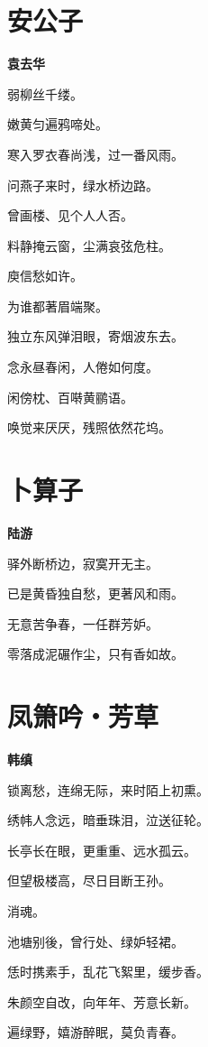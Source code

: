 \documentclass[12pt,a4paper]{ctexbook}
\begin{document}
\section{安公子}
\textbf{袁去华}\par\vspace{0.5em}
弱柳丝千缕。\par
嫩黄匀遍鸦啼处。\par
寒入罗衣春尚浅，过一番风雨。\par
问燕子来时，绿水桥边路。\par
曾画楼、见个人人否。\par
料静掩云窗，尘满哀弦危柱。\par
庾信愁如许。\par
为谁都著眉端聚。\par
独立东风弹泪眼，寄烟波东去。\par
念永昼春闲，人倦如何度。\par
闲傍枕、百啭黄鹂语。\par
唤觉来厌厌，残照依然花坞。\par

\section{卜算子}
\textbf{陆游}\par\vspace{0.5em}
驿外断桥边，寂寞开无主。\par
已是黄昏独自愁，更著风和雨。\par
无意苦争春，一任群芳妒。\par
零落成泥碾作尘，只有香如故。\par

\section{凤箫吟・芳草}
\textbf{韩缜}\par\vspace{0.5em}
锁离愁，连绵无际，来时陌上初熏。\par
绣帏人念远，暗垂珠泪，泣送征轮。\par
长亭长在眼，更重重、远水孤云。\par
但望极楼高，尽日目断王孙。\par
消魂。\par
池塘别後，曾行处、绿妒轻裙。\par
恁时携素手，乱花飞絮里，缓步香。\par
朱颜空自改，向年年、芳意长新。\par
遍绿野，嬉游醉眠，莫负青春。\par
\end{document}
